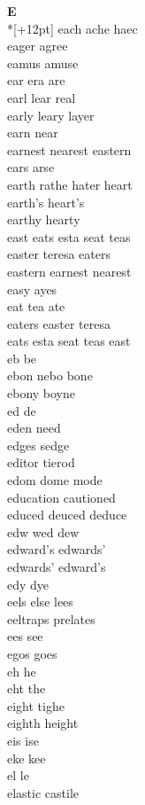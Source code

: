 \vspace{14pt}
\noindent\textbf{\Large E}\\*[+12pt]
each ache haec\\
eager agree\\
eamus amuse\\
ear era are\\
earl lear real\\
early leary layer\\
earn near\\
earnest nearest eastern\\
ears arse\\
earth rathe hater heart\\
earth's heart's\\
earthy hearty\\
east eats esta seat teas\\
easter teresa eaters\\
eastern earnest nearest\\
easy ayes\\
eat tea ate\\
eaters easter teresa\\
eats esta seat teas east\\
eb be\\
ebon nebo bone\\
ebony boyne\\
ed de\\
eden need\\
edges sedge\\
editor tierod\\
edom dome mode\\
education cautioned\\
educed deuced deduce\\
edw wed dew\\
edward's edwards'\\
edwards' edward's\\
edy dye\\
eels else lees\\
eeltraps prelates\\
ees see\\
egos goes\\
eh he\\
eht the\\
eight tighe\\
eighth height\\
eis ise\\
eke kee\\
el le\\
elastic castile\\
